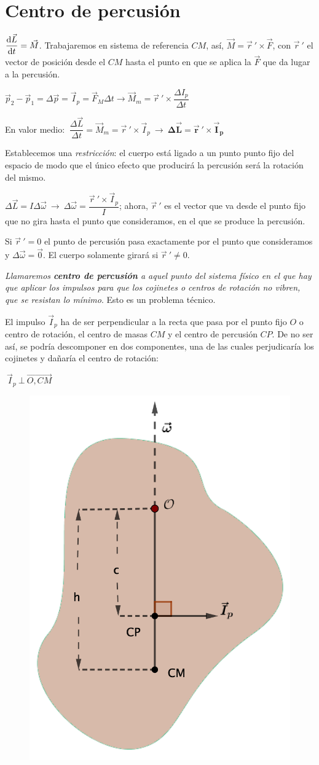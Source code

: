 \section{Centro de percusión}

$\displaystyle \dv{\vec L}{t}=\vec M$.  Trabajaremos en sistema de referencia $CM$, así, $\vec M=\vec r\ ' \times \vec F$, con $\vec r\ '$ el vector de posición desde el $CM$ hasta el punto en que se aplica la $\vec F$ que da lugar a la percusión.

 $\vec p_2-\vec p_1=\Delta \vec p=\vec I_p =\vec F_M \Delta t \to \vec M_m=\vec r \ ' \times \dfrac{\Delta I_p}{\Delta t}$
 
 En valor medio: $\ \dfrac {\Delta \vec L}{\Delta t}=\vec M_m=\vec r\ ' \times \vec I_p \ \to \ \boldsymbol{\Delta \vec L = \vec r \ ' \times \vec I_p}$

Establecemos una \emph{restricción}: el cuerpo está ligado a un punto punto fijo del espacio de modo que el único efecto que producirá la percusión será la rotación del mismo.

$\Delta \vec L=I\Delta \vec \omega \ \to \ \Delta \vec \omega = \dfrac{\vec r\ ' \times \vec I_p}{I}$; ahora, $\vec r\ '$ es el vector que va desde el punto fijo que no gira hasta el punto que consideramos, en el que se produce la percusión.

Si $\vec r\ '=0$ el punto de percusión pasa exactamente por el punto que consideramos y $\Delta \vec \omega =\vec 0$. El cuerpo solamente girará si $\vec r\ '\neq 0$.

\emph{Llamaremos \textbf{centro de percusión} a aquel punto del sistema físico en el que hay que aplicar los impulsos para que los cojinetes o centros de rotación no vibren, que se resistan lo mínimo}. Esto es un problema técnico.

\begin{multicols}{2}
El impulso $\vec I_p$ ha de ser perpendicular a la recta que pasa por el punto fijo $O$ o centro de rotación, el centro de masas $CM$ y el centro de percusión $CP$. De no ser así, se podría descomponer en dos componentes, una de las cuales perjudicaría los cojinetes y dañaría el centro de rotación:

 $\ \vec I_p \ \bot \ \overrightarrow{O,CM}$
\begin{figure}[H]
	\centering
	\includegraphics[width=.35\textwidth]{imagenes/imagenes17/T17IM01.png}
	\end{figure}	
\end{multicols}

